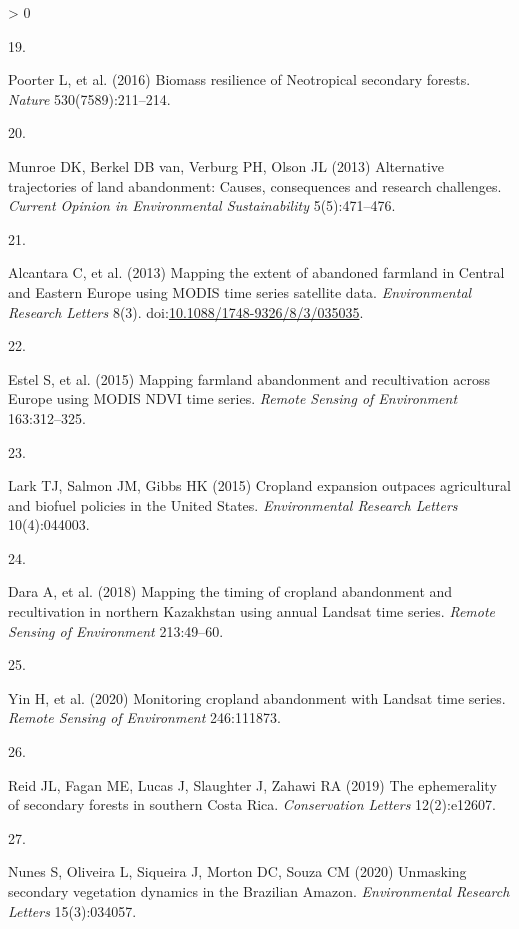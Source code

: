 \documentclass[9pt,twocolumn,twoside,lineno]{pnas-new}
\newlength{\csllabelwidth}
\newlength{\cslhangindent}
\newenvironment{CSLReferences}[2] %
 {%
  \setlength{\parindent}{0pt}
  \ifodd #1 \everypar{\setlength{\hangindent}{\cslhangindent}}\ignorespaces\fi
  \ifnum #2 > 0
  \setlength{\parskip}{#2\baselineskip}
  \fi
 }%
 {}
\newcommand{\CSLLeftMargin}[1]{\parbox[t]{\csllabelwidth}{#1}}
\newcommand{\CSLRightInline}[1]{\parbox[t]{\linewidth - \csllabelwidth}{#1}\break}
\begin{document}
\begin{CSLReferences}{0}{0}
\leavevmode\hypertarget{ref-Poorter2016}{}%
\CSLLeftMargin{19. }
\CSLRightInline{Poorter L, et al. (2016) {Biomass resilience of Neotropical secondary forests}. \emph{Nature} 530(7589):211--214.}

\leavevmode\hypertarget{ref-Munroe2013}{}%
\CSLLeftMargin{20. }
\CSLRightInline{Munroe DK, Berkel DB van, Verburg PH, Olson JL (2013) {Alternative trajectories of land abandonment: Causes, consequences and research challenges}. \emph{Current Opinion in Environmental Sustainability} 5(5):471--476.}

\leavevmode\hypertarget{ref-Alcantara2013}{}%
\CSLLeftMargin{21. }
\CSLRightInline{Alcantara C, et al. (2013) {Mapping the extent of abandoned farmland in Central and Eastern Europe using MODIS time series satellite data}. \emph{Environmental Research Letters} 8(3). doi:\href{https://doi.org/10.1088/1748-9326/8/3/035035}{10.1088/1748-9326/8/3/035035}.}

\leavevmode\hypertarget{ref-Estel2015}{}%
\CSLLeftMargin{22. }
\CSLRightInline{Estel S, et al. (2015) {Mapping farmland abandonment and recultivation across Europe using MODIS NDVI time series}. \emph{Remote Sensing of Environment} 163:312--325.}

\leavevmode\hypertarget{ref-Lark2015}{}%
\CSLLeftMargin{23. }
\CSLRightInline{Lark TJ, Salmon JM, Gibbs HK (2015) {Cropland expansion outpaces agricultural and biofuel policies in the United States}. \emph{Environmental Research Letters} 10(4):044003.}

\leavevmode\hypertarget{ref-Dara2018}{}%
\CSLLeftMargin{24. }
\CSLRightInline{Dara A, et al. (2018) {Mapping the timing of cropland abandonment and recultivation in northern Kazakhstan using annual Landsat time series}. \emph{Remote Sensing of Environment} 213:49--60.}

\leavevmode\hypertarget{ref-Yin2020}{}%
\CSLLeftMargin{25. }
\CSLRightInline{Yin H, et al. (2020) {Monitoring cropland abandonment with Landsat time series}. \emph{Remote Sensing of Environment} 246:111873.}

\leavevmode\hypertarget{ref-Reid2019}{}%
\CSLLeftMargin{26. }
\CSLRightInline{Reid JL, Fagan ME, Lucas J, Slaughter J, Zahawi RA (2019) {The ephemerality of secondary forests in southern Costa Rica}. \emph{Conservation Letters} 12(2):e12607.}

\leavevmode\hypertarget{ref-Nunes2020}{}%
\CSLLeftMargin{27. }
\CSLRightInline{Nunes S, Oliveira L, Siqueira J, Morton DC, Souza CM (2020) {Unmasking secondary vegetation dynamics in the Brazilian Amazon}. \emph{Environmental Research Letters} 15(3):034057.}


\end{CSLReferences}
\end{document}
